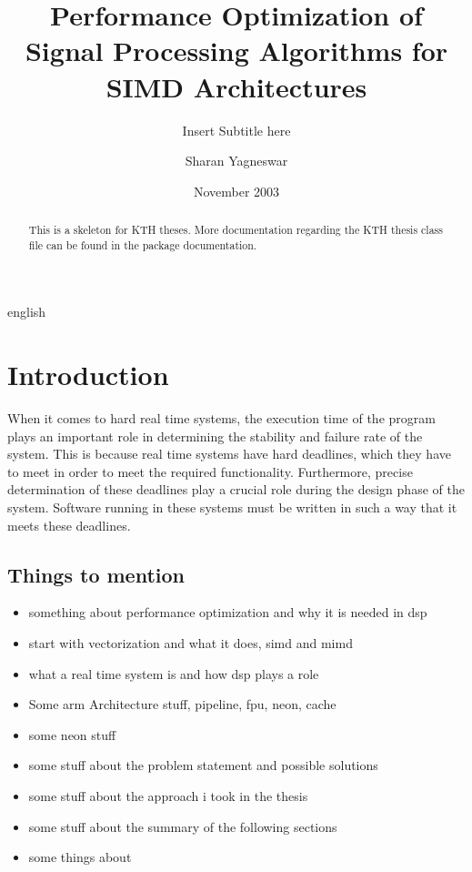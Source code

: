 \documentclass[a4paper,11pt]{kth-mag}
\title{Performance Optimization of Signal Processing Algorithms for SIMD Architectures}
\subtitle{Insert Subtitle here}
\author{Sharan Yagneswar}
\date{November 2003}
\begin{document}
\frontmatter
\pagestyle{empty}
\removepagenumbers
\maketitle
{}


\begin{abstract}
  This is a skeleton for KTH theses. More documentation
  regarding the KTH thesis class file can be found in
  the package documentation.
\end{abstract}

\clearpage
\begin{foreignabstract}{english}

\end{foreignabstract}
\clearpage
\tableofcontents*
\mainmatter
\pagestyle{newchap}
\chapter{Introduction}

When it comes to hard real time systems, the execution time of the program plays an important role in determining the stability and failure rate of the system. This is because real time systems have hard deadlines, which they have to meet in order to meet the required functionality. Furthermore, precise determination of these deadlines play a crucial role during the design phase of the system. Software running in these systems must be written in such a way that it meets these deadlines. 
\section{Things to mention}

\begin{itemize}
  \item something about performance optimization and why it is needed in dsp
  \item start with vectorization and what it does, simd and mimd
  \item what a real time system is and how dsp plays a role
  \item Some arm Architecture stuff, pipeline, fpu, neon, cache 
  \item some neon stuff
  \item some stuff about the problem statement and possible solutions
  \item some stuff about the approach i took in the thesis
  \item some stuff about the summary of the following sections
  \item some things about 
\end{itemize}
\end{document}
